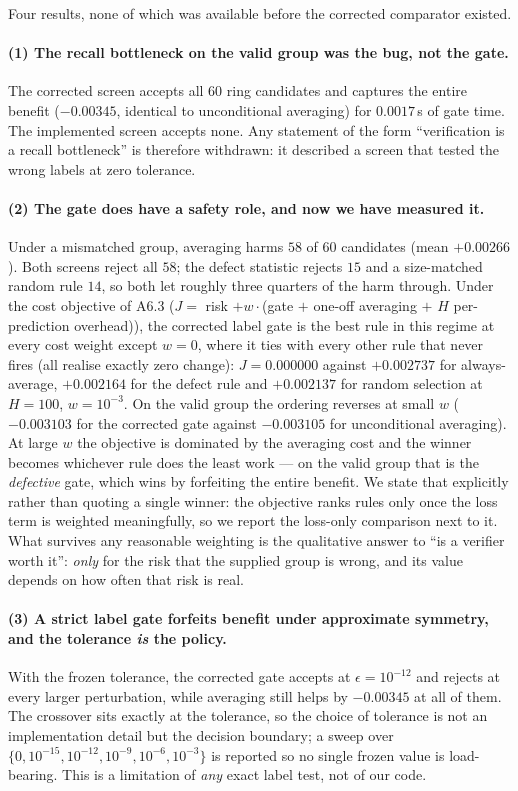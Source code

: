 \documentclass{neurips_2024}
\begin{document}
Four results, none of which was available before the corrected comparator existed.

\paragraph{(1) The recall bottleneck on the valid group was the bug, not the gate.}
The corrected screen accepts all $60$ ring candidates and captures the entire benefit
($-0.00345$, identical to unconditional averaging) for $0.0017$\,s of gate time. The
implemented screen accepts none. Any statement of the form ``verification is a recall
bottleneck'' is therefore withdrawn: it described a screen that tested the wrong labels at
zero tolerance.

\paragraph{(2) The gate does have a safety role, and now we have measured it.}
Under a mismatched group, averaging harms $58$ of $60$ candidates (mean $+0.00266$). Both
screens reject all $58$; the defect statistic rejects $15$ and a size-matched random rule
$14$, so both let roughly three quarters of the harm through. Under the cost objective of
A6.3 ($J = $ risk $+ w\cdot$(gate $+$ one-off averaging $+$ $H$ per-prediction overhead)),
the corrected label gate is the best rule in this regime at every cost weight except $w{=}0$,
where it ties with every other rule that never fires (all realise exactly zero change):
$J{=}0.000000$ against $+0.002737$ for always-average, $+0.002164$ for the defect rule and
$+0.002137$ for random selection at $H{=}100$, $w{=}10^{-3}$. On the valid group the ordering
reverses at small $w$ ($-0.003103$ for the corrected gate against $-0.003105$ for unconditional
averaging). At large $w$ the objective is dominated by the averaging cost and the winner becomes
whichever rule does the least work --- on the valid group that is the \emph{defective} gate, which
wins by forfeiting the entire benefit. We state that explicitly rather than quoting a single
winner: the objective ranks rules only once the loss term is weighted meaningfully, so we report
the loss-only comparison next to it. What survives any reasonable weighting is the qualitative
answer to ``is a verifier worth it'': \emph{only} for the risk that the supplied group is wrong,
and its value depends on how often that risk is real.

\paragraph{(3) A strict label gate forfeits benefit under approximate symmetry, and the
tolerance \emph{is} the policy.} With the frozen tolerance, the corrected gate accepts at
$\epsilon = 10^{-12}$ and rejects at every larger perturbation, while averaging still helps by
$-0.00345$ at all of them. The crossover sits exactly at the tolerance, so the choice of
tolerance is not an implementation detail but the decision boundary; a sweep over
$\{0,10^{-15},10^{-12},10^{-9},10^{-6},10^{-3}\}$ is reported so no single frozen value is
load-bearing. This is a limitation of \emph{any} exact label test, not of our code.
\end{document}
